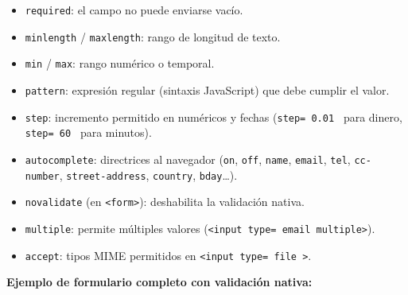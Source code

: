 \documentclass[11pt,a4paper,openany]{book}
\begin{document}
\begin{itemize}
\item \texttt{required}: el campo no puede enviarse vacío.
\item \texttt{minlength} / \texttt{maxlength}: rango de longitud de
texto.
\item \texttt{min} / \texttt{max}: rango numérico o temporal.
\item \texttt{pattern}: expresión regular (sintaxis JavaScript) que
debe cumplir el valor.
\item \texttt{step}: incremento permitido en numéricos y fechas
(\texttt{step= 0.01 } para dinero, \texttt{step= 60 } para minutos).
\item \texttt{autocomplete}: directrices al navegador (\texttt{on},
\texttt{off}, \texttt{name}, \texttt{email}, \texttt{tel},
\texttt{cc-number}, \texttt{street-address}, \texttt{country},
\texttt{bday}\dots).
\item \texttt{novalidate} (en \texttt{<form>}): deshabilita la
validación nativa.
\item \texttt{multiple}: permite múltiples valores
(\texttt{<input type= email  multiple>}).
\item \texttt{accept}: tipos MIME permitidos en \texttt{<input
type= file >}.
\end{itemize}

\textbf{Ejemplo de formulario completo con validación nativa:}
\end{document}

